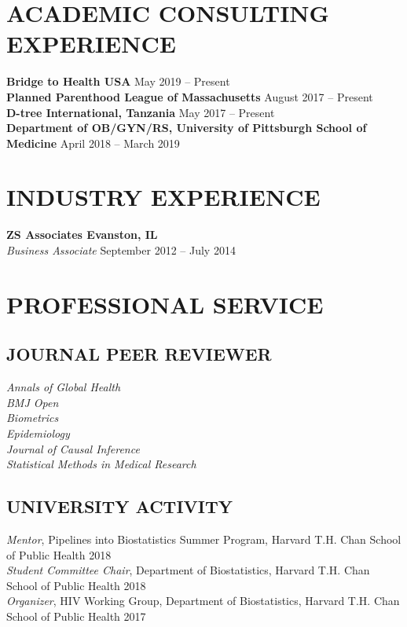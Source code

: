 \documentclass[12pt]{article}
\begin{document}
\section*{\textbf{{\large A}{CADEMIC} {\large C}{ONSULTING} {\large E}{XPERIENCE}}}
\textbf{Bridge to Health USA \hfill \hfill }May 2019 -- Present  \\
\textbf{Planned Parenthood League of Massachusetts \hfill \hfill }August 2017 -- Present  \\
\textbf{D-tree International, Tanzania \hfill \hfill }May 2017 -- Present \\
\textbf{Department of OB/GYN/RS, University of Pittsburgh School of Medicine  \hfill \hfill }April 2018 -- March 2019 

\section*{\textbf{{\large I}{NDUSTRY} {\large E}{XPERIENCE}}}
\textbf{ZS Associates \hfill \hfill Evanston, IL} \\
\textit{Business Associate} \hfill \hfill September 2012 -- July 2014 

\section*{\textbf{{\large P}{ROFESSIONAL} {\large S}{ERVICE}}}
\subsection*{\textbf{JOURNAL PEER REVIEWER}}
\textit{Annals of Global Health} \\ 
\textit{BMJ Open} \\ 
\textit{Biometrics} \\
\textit{Epidemiology} \\
\textit{Journal of Causal Inference} \\ 
\textit{Statistical Methods in Medical Research}

\subsection*{\textbf{UNIVERSITY ACTIVITY}}
\textit{Mentor}, Pipelines into Biostatistics Summer Program, Harvard T.H. Chan School of
Public Health \hfill \hfill 2018 \\
\textit{Student Committee Chair}, Department of Biostatistics, Harvard T.H. Chan School of
Public Health \hfill \hfill 2018 \\
\textit{Organizer}, HIV Working Group, Department of Biostatistics, Harvard T.H. Chan School of
Public Health \hfill \hfill 2017 
\end{document}

